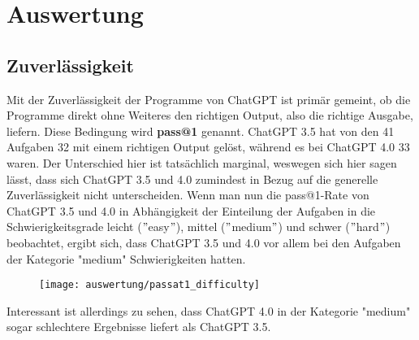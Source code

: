 \documentclass[class=scrbook, crop=false]{standalone}
\begin{document}
\chapter{Auswertung}
\label{ch::auswertung}

\section{Zuverlässigkeit}
\label{sec:zuverleassigkeit}
    Mit der Zuverlässigkeit der Programme von ChatGPT ist primär gemeint, ob die Programme direkt ohne Weiteres den
    richtigen Output, also die richtige Ausgabe, liefern.
    Diese Bedingung wird \textbf{pass@1} genannt.
    ChatGPT 3.5 hat von den 41 Aufgaben 32 mit einem richtigen Output gelöst, während es bei ChatGPT 4.0 33 waren.
    Der Unterschied hier ist tatsächlich marginal, weswegen sich hier sagen lässt, dass sich ChatGPT 3.5 und 4.0 zumindest in
    Bezug auf die generelle Zuverlässigkeit nicht unterscheiden.
    Wenn man nun die pass@1-Rate von ChatGPT 3.5 und 4.0 in Abhängigkeit der Einteilung der Aufgaben in die Schwierigkeitsgrade
    leicht (\("\)easy\("\)), mittel (\("\)medium\("\)) und schwer (\("\)hard\("\)) beobachtet, ergibt sich, dass
    ChatGPT 3.5 und 4.0 vor allem bei den Aufgaben der Kategorie "medium" Schwierigkeiten hatten.
    \newline
    \begin{figure}[H]
        \centering
        \texttt{[image: auswertung/passat1\_difficulty]}
        \caption{}
        \label{fig:1}
    \end{figure}

    Interessant ist allerdings zu sehen, dass ChatGPT 4.0 in der Kategorie "medium" sogar schlechtere Ergebnisse liefert als ChatGPT 3.5.
\end{document}
